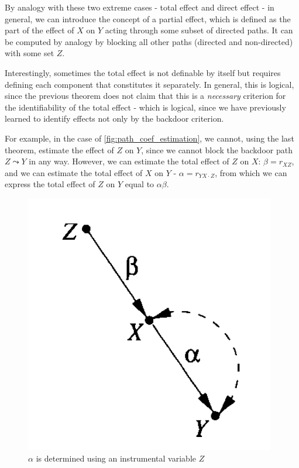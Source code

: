 \documentclass[fleqn]{article}
\numberwithin{equation}{section}
\numberwithin{theorem}{section}
\numberwithin{figure}{section}
\numberwithin{lemma}{section}
\numberwithin{corollary}{section}
\begin{document}
By analogy with these two extreme cases - total effect and direct effect - in general, we can introduce the concept of a partial effect, which is defined as the part of the effect of $X$ on $Y$ acting through some subset of directed paths. It can be computed by analogy by blocking all other paths (directed and non-directed) with some set $Z$. 

Interestingly, sometimes the total effect is not definable by itself but requires defining each component that constitutes it separately. In general, this is logical, since the previous theorem does not claim that this is a \textit{necessary} criterion for the identifiability of the total effect - which is logical, since we have previously learned to identify effects not only by the backdoor criterion.

For example, in the case of \ref{fig:path_coef_estimation}, we cannot, using the last theorem, estimate the effect of $Z$ on $Y$, since we cannot block the backdoor path $Z \leadsto Y$ in any way. However, we can estimate the total effect of $Z$ on $X$: $\beta = r_{XZ}$, and we can estimate the total effect of $X$ on $Y$ - $\alpha = r_{YX\cdot Z}$, from which we can express the total effect of $Z$ on $Y$ equal to $\alpha\beta$.

\begin{figure}[h]
	\begin{center}
		\includegraphics[scale=0.6]{imgs/img33.png}
	\end{center}
	\caption{$\alpha$ is determined using an instrumental variable $Z$}
	\label{fig:path_coef}
\end{figure}
\end{document}
